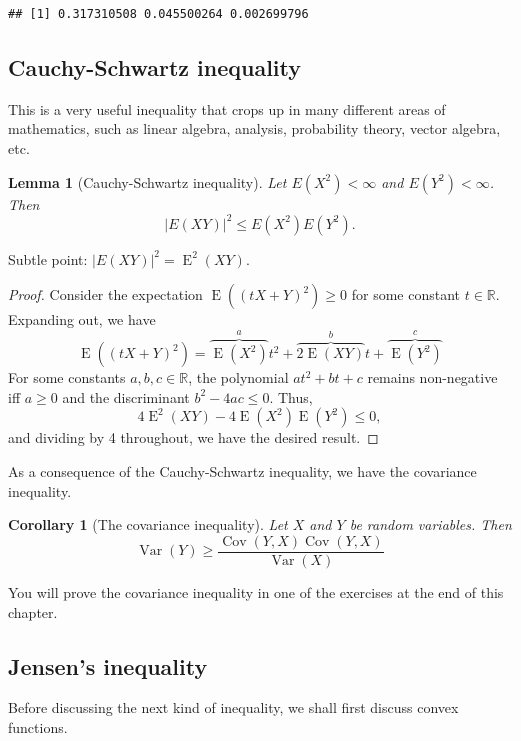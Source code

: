 \documentclass[
]{book}
\DeclareMathOperator{\E}{E}
\DeclareMathOperator{\Var}{Var}
\DeclareMathOperator{\Cov}{Cov}
\newcommand{\bbR}{\mathbb{R}}
\newtheorem{lemma}{Lemma}[chapter]
\newtheorem{corollary}{Corollary}[chapter]
\theoremstyle{definition}
\theoremstyle{definition}
\theoremstyle{definition}
\theoremstyle{definition}
\theoremstyle{remark}
\begin{document}
\begin{verbatim}
## [1] 0.317310508 0.045500264 0.002699796
\end{verbatim}

\hypertarget{cauchy-schwartz-inequality}{%
\subsection{Cauchy-Schwartz inequality}\label{cauchy-schwartz-inequality}}

This is a very useful inequality that crops up in many different areas of mathematics, such as linear algebra, analysis, probability theory, vector algebra, etc.

\begin{lemma}[Cauchy-Schwartz inequality]
Let \(E(X^2)<\infty\) and \(E(Y^2)<\infty\). Then
\[|E(XY)|^2 \leq E(X^2)E(Y^2).\]
\end{lemma}

Subtle point: \(|E(XY)|^2 = \E^2(XY)\).

\begin{proof}
Consider the expectation \(\E((tX+Y)^2)\geq 0\) for some constant \(t\in\bbR\).
Expanding out, we have
\[
\E((tX+Y)^2) = \overbrace{\E(X^2)}^{a}t^2 + \overbrace{2\E(XY)}^{b}t+ \overbrace{\E(Y^2)}^{c}
\]
For some constants \(a,b,c\in\bbR\), the polynomial \(at^2 +bt + c\) remains non-negative iff \(a\geq 0\) and the discriminant \(b^2-4ac \leq 0\). Thus,
\[
4\E^2(XY) - 4\E(X^2)\E(Y^2) \leq 0,
\]
and dividing by 4 throughout, we have the desired result.
\end{proof}

As a consequence of the Cauchy-Schwartz inequality, we have the covariance inequality.

\begin{corollary}[The covariance inequality]
Let \(X\) and \(Y\) be random variables. Then
\[\Var(Y) \geq \frac{\Cov(Y,X)\Cov(Y,X)}{\Var(X)}\]
\end{corollary}

You will prove the covariance inequality in one of the exercises at the end of this chapter.

\hypertarget{jensens-inequality}{%
\subsection{Jensen's inequality}\label{jensens-inequality}}

Before discussing the next kind of inequality, we shall first discuss convex functions.
\end{document}
